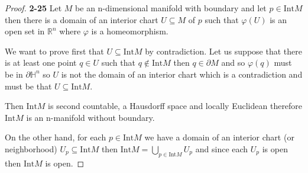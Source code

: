\documentclass[11pt]{article}
\newcommand{\R}{\mathbb{R}}
\newcommand{\HH}{\mathbb{H}}
\newcommand{\inter}{\text{Int}}
\theoremstyle{definition}
\begin{document}
\begin{proof}{\textbf{2-25}}
    Let $M$ be an n-dimensional manifold with boundary and let $p \in \inter M$
    then there is a domain of an interior chart $U \subseteq M$ of $p$ such
    that $\varphi(U)$ is an open set in $\R^n$ where $\varphi$
    is a homeomorphism.
    
    We want to prove first that $U \subseteq \inter M$ by contradiction.
    Let us suppose that there is at least one point $q \in U$ such that
    $q \not\in \inter M$ then $q \in \partial M$ and so $\varphi(q)$ must be
    in $\partial \HH^n$ so $U$ is not the domain of an interior chart which is
    a contradiction and must be that $U \subseteq \inter M$.

    Then $\inter M$ is second countable, a Hausdorff
    space and locally Euclidean therefore $\inter M$ is an n-manifold without
    boundary.

    On the other hand, for each $p \in \inter M$ we have a domain of an interior 
    chart (or neighborhood) $U_p \subseteq \inter M$ then
    $\inter M = \bigcup_{p\in\inter M} U_p$ and since each $U_p$ is open then
    $\inter M$ is open.
\end{proof}
\end{document}
